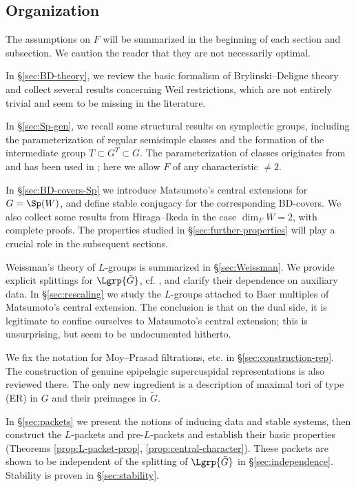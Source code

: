 \documentclass[a4paper,10pt]{article}
\begin{document}
\subsection*{Organization}
The assumptions on $F$ will be summarized in the beginning of each section and subsection. We caution the reader that they are not necessarily optimal.

In \S\ref{sec:BD-theory}, we review the basic formalism of Brylinski--Deligne theory and collect several results concerning Weil restrictions, which are not entirely trivial and seem to be missing in the literature.

In \S\ref{sec:Sp-gen}, we recall some structural results on symplectic groups, including the parameterization of regular semisimple classes and the formation of the intermediate group $T \subset G^T \subset G$. The parameterization of classes originates from \cite{SS70} and has been used in \cite{Wa01, Li11}; here we allow $F$ of any characteristic $\neq 2$.

In \S\ref{sec:BD-covers-Sp} we introduce Matsumoto's central extensions for $G = \Sp(W)$, and define stable conjugacy for the corresponding BD-covers. We also collect some results from Hiraga--Ikeda in the case $\dim_F W = 2$, with complete proofs. The properties studied in \S\ref{sec:further-properties} will play a crucial role in the subsequent sections.

Weissman's theory of $L$-groups is summarized in \S\ref{sec:Weissman}. We provide explicit splittings for $\Lgrp{\tilde{G}}$, cf. \cite{GG}, and clarify their dependence on auxiliary data. In \S\ref{sec:rescaling} we study the $L$-groups attached to Baer multiples of Matsumoto's central extension. The conclusion is that on the dual side, it is legitimate to confine ourselves to Matsumoto's central extension; this is unsurprising, but seem to be undocumented hitherto.

We fix the notation for Moy--Prasad filtrations, etc.\! in \S\ref{sec:construction-rep}. The construction of genuine epipelagic supercuspidal representations is also reviewed there. The only new ingredient is a description of maximal tori of type (ER) in $G$ and their preimages in $\tilde{G}$.

In \S\ref{sec:packets} we present the notions of inducing data and stable systems, then construct the $L$-packets and pre-$L$-packets and establish their basic properties (Theorems \ref{prop:L-packet-prop}, \ref{prop:central-character}). These packets are shown to be independent of the splitting of $\Lgrp{\tilde{G}}$ in \S\ref{sec:independence}. Stability is proven in \S\ref{sec:stability}.
\end{document}
